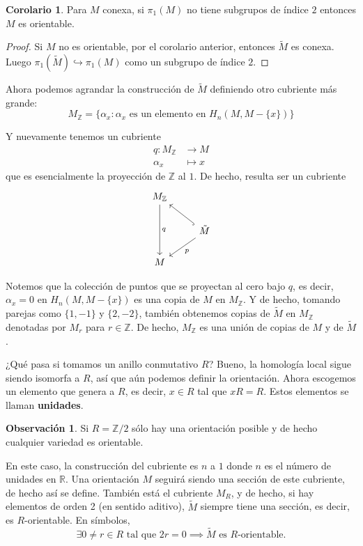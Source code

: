 \documentclass[spanish]{book}
\theoremstyle{definition}
\newtheorem*{obs}{Observación}
\newtheorem*{coro}{Corolario}
\newcommand{\R}{\mathbb{R}}
\newcommand{\Z}{\mathbb{Z}}
\begin{document}
\begin{coro}
	Para $M$ conexa, si $\pi_1(M)$ no tiene subgrupos de índice $2$ entonces $M$ es orientable.
\end{coro}
\begin{proof}
	Si $M$ no es orientable, por el corolario anterior, entonces $\tilde{M}$ es conexa. Luego $\pi_1(\tilde{M})\hookrightarrow\pi_1(M)$ como un subgrupo de índice $2$.
\end{proof}

Ahora podemos agrandar la construcción de $\tilde{M}$ definiendo otro cubriente más grande:
\[M_\Z=\{\alpha_x:\alpha_x\text{ es un elemento en }H_n(M,M-\{x\})\}\] 

Y nuevamente tenemos un cubriente
\begin{align*}
	q:M_\Z&\to M\\
	\alpha_x&\mapsto x
\end{align*}
que es esencialmente la proyección de $\Z$ al $1$. De hecho, resulta ser un cubriente
\[\begin{tikzcd}
	M_\Z\arrow[dd,"q"]\\
	&\tilde{M}\arrow[ul,hook]\arrow[dl,"p"]\\
	M
\end{tikzcd}\]

Notemos que la colección de puntos que se proyectan al cero bajo $q$, es decir, $\alpha_x=0$ en $H_n(M,M-\{x\})$ es una copia de $M$ en $M_\Z$. Y de hecho, tomando parejas como $\{1,-1\}$ y $\{2,-2\}$, también obtenemos copias de $\tilde{M}$ en $M_\Z$ denotadas por $M_r$ para $r\in\Z$. De hecho, $M_\Z$ es una unión de copias de $M$ y de $\tilde{M}$.

¿Qué pasa si tomamos un anillo conmutativo $R$? Bueno, la homología local sigue siendo isomorfa a $R$, así que aún podemos definir la orientación. Ahora escogemos un elemento que genera a $R$, es decir, $x\in R$ tal que $xR=R$. Estos elementos se llaman \textbf{unidades}.

\begin{obs}
	Si $R=\Z/2$ sólo hay una orientación posible y de hecho cualquier variedad es orientable.
\end{obs}

En este caso, la construcción del cubriente es $n$ a $1$ donde $n$ es el número de unidades en $\R$. Una orientación $M$ seguirá siendo una sección de este cubriente, de hecho así se define. También está el cubriente $M_R$, y de hecho, si hay elementos de orden 2 (en sentido aditivo), $\tilde{M}$ siempre tiene una sección, es decir, es $R$-orientable. En símbolos,
\[\exists 0\neq r\in R\text{ tal que }2r=0\implies \tilde{M} \text{ es }R\text{-orientable.}\]
\end{document}
